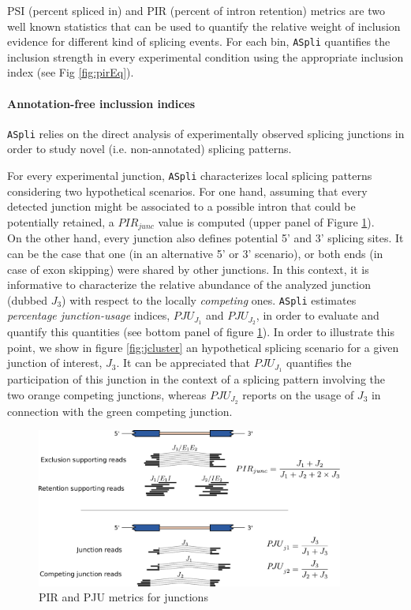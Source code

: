 \documentclass{article}
\begin{document}
PSI (percent spliced in) \cite{Schafer2015} and PIR (percent of intron retention) metrics are two well known statistics that can be used to quantify the relative weight of inclusion evidence for different kind of splicing events. For each bin, \texttt{ASpli} quantifies the inclusion strength in every experimental condition using the appropriate inclusion index (see Fig \ref{fig:pirEq}).


\paragraph{Annotation-free inclussion indices }

\texttt{ASpli} relies on the direct analysis of experimentally observed splicing junctions in order to study novel (i.e. non-annotated) splicing patterns. 

For every experimental junction, \texttt{ASpli} characterizes local splicing patterns  considering two hypothetical scenarios. For one hand, assuming that every detected junction might be associated to a possible intron that could be potentially retained, a $PIR_{junc}$ value is computed (upper panel of Figure \ref{fig:psir_junc}).\\

On the other hand, every junction also defines potential 5' and 3' splicing sites. It can be the case that one (in an alternative 5' or 3' scenario), or both ends (in case of exon skipping) were shared by other junctions. In this context, it is informative to characterize the relative abundance of the analyzed junction (dubbed $J_3$) with respect to the locally {\em competing} ones. \texttt{ASpli} estimates {\em percentage junction-usage} indices, $PJU_{J_1}$ and $PJU_{J_2}$, in order to evaluate and quantify this quantities (see bottom panel of figure \ref{fig:psir_junc}). In order to illustrate this point, we show in figure \ref{fig:jcluster} an hypothetical splicing scenario for a given junction of interest, $J_3$. It can be appreciated that $PJU_{J_1}$ quantifies the participation of this junction in the context of a splicing pattern involving the two orange competing junctions, whereas $PJU_{J_2}$ reports on the usage of $J_3$ in connection with the green competing junction.  

\begin{figure}[ht!]
  \centering
  \includegraphics[width=0.9\textwidth]{images/psi_pir_junc_ok.pdf}
  \caption{PIR and PJU metrics for junctions}
  \label{fig:psir_junc}
\end{figure}
\end{document}
